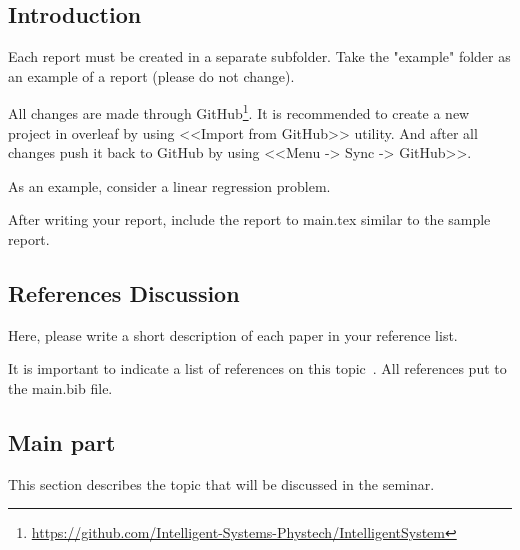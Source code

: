 \documentclass[../../main.tex]{subfiles}
\begin{document}
\subsection{Introduction}

Each report must be created in a separate subfolder. Take the "example" folder as an example of a report (please do not change).

All changes are made through GitHub\footnote{\url{https://github.com/Intelligent-Systems-Phystech/IntelligentSystem}}. It is recommended to create a new project in overleaf by using <<Import from GitHub>> utility. And after all changes push it back to GitHub by using <<Menu -> Sync -> GitHub>>.

As an example, consider a linear regression problem.


After writing your report, include the report to main.tex similar to the sample report.

\subsection{References Discussion}

Here, please write a short description of each paper in your reference list.

It is important to indicate a list of references on this topic~\cite{AuthorYear}. All references put to the main.bib file.


\subsection{Main part}

This section describes the topic that will be discussed in the seminar.
\end{document}
